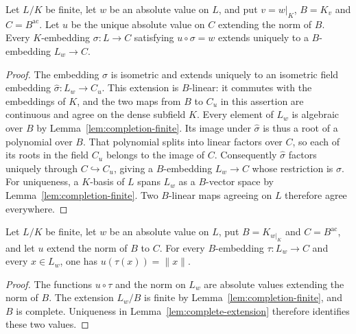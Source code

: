 \begin{lemma}\label{lem:completed-embedding-lift}
\leanok
{}
Let $L/K$ be finite, let $w$ be an absolute value on $L$, and put
$v=w|_K$, $B=K_v$ and $C=B^{\mathrm{ac}}$. Let $u$ be the unique
absolute value on $C$ extending the norm of $B$.
Every $K$-embedding $\sigma:L\to C$ satisfying $u\circ\sigma=w$
extends uniquely to a $B$-embedding $L_w\to C$.
\end{lemma}
\begin{proof}
The embedding $\sigma$ is isometric and
extends uniquely to an isometric field embedding
$\widehat\sigma:L_w\to C_u$. This extension is $B$-linear: it commutes
with the embeddings of $K$, and the two maps from $B$ to $C_u$ in this
assertion are continuous and agree on the dense subfield $K$.
Every element of $L_w$ is algebraic over $B$ by
Lemma~\ref{lem:completion-finite}. Its image under $\widehat\sigma$
is thus a root of a polynomial over $B$. That polynomial splits into
linear factors over $C$, so each of its roots in the field $C_u$ belongs
to the image of $C$. Consequently $\widehat\sigma$ factors uniquely
through $C\hookrightarrow C_u$, giving a $B$-embedding $L_w\to C$
whose restriction is $\sigma$. For uniqueness, a $K$-basis of $L$
spans $L_w$ as a $B$-vector space by
Lemma~\ref{lem:completion-finite}. Two $B$-linear maps agreeing on $L$
therefore agree everywhere.
\end{proof}

\begin{lemma}\label{lem:completed-embedding-norm}
\leanok
{}
Let $L/K$ be finite, let $w$ be an absolute value on $L$, put
$B=K_{w|_K}$ and $C=B^{\mathrm{ac}}$, and let $u$ extend the norm of
$B$ to $C$. For every $B$-embedding $\tau:L_w\to C$ and every
$x\in L_w$, one has $u(\tau(x))=\lVert x\rVert$.
\end{lemma}
\begin{proof}
The functions $u\circ\tau$ and the norm on $L_w$ are absolute values
extending the norm of $B$. The extension $L_w/B$ is finite by
Lemma~\ref{lem:completion-finite}, and $B$ is complete. Uniqueness in
Lemma~\ref{lem:complete-extension} therefore identifies these two values.
\end{proof}

